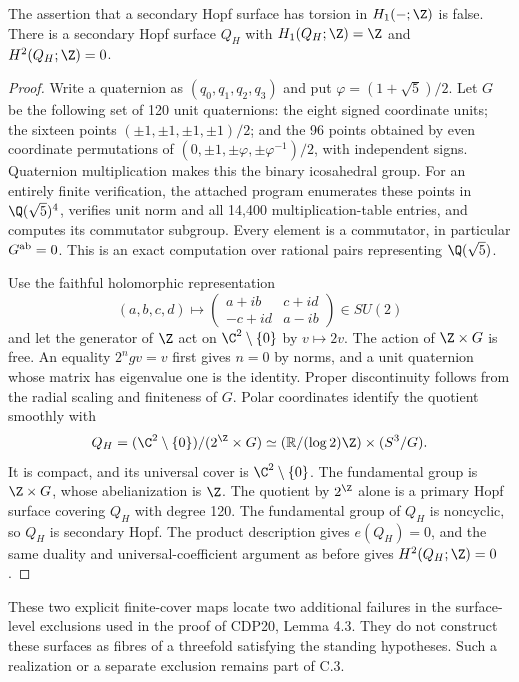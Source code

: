 
\begin{proposition}\label{cdp:st:C.3.3}

The assertion that a secondary Hopf surface has torsion in
$H_1(-;\Z)$ is false. There is a secondary Hopf surface $Q_H$ with
$H_1(Q_H;\Z)=\Z$ and $H^2(Q_H;\Z)=0$.
\end{proposition}
\begin{proof}
Write a quaternion as $(q_0,q_1,q_2,q_3)$ and put
$\varphi=(1+\sqrt5)/2$. Let $G$ be the following set of 120 unit
quaternions: the eight signed coordinate units; the sixteen points
$(\pm1,\pm1,\pm1,\pm1)/2$; and the 96 points obtained by even
coordinate permutations of
$(0,\pm1,\pm\varphi,\pm\varphi^{-1})/2$, with independent signs.
Quaternion multiplication makes this the binary icosahedral group.
For an entirely finite verification, the attached program enumerates
these points in $\Q(\sqrt5)^4$, verifies unit norm and all 14,400
multiplication-table entries, and computes its commutator subgroup.
Every element is a commutator, in particular $G^{\rm ab}=0$.
This is an exact computation over rational pairs representing
$\Q(\sqrt5)$.

Use the faithful holomorphic representation
\[
(a,b,c,d)\longmapsto
\begin{pmatrix}a+ib&c+id\\-c+id&a-ib\end{pmatrix}\in SU(2)
\]
and let the generator of $\Z$ act on $\C^2\setminus\{0\}$ by
$v\mapsto2v$. The action of $\Z\times G$ is free. An equality
$2^ngv=v$ first gives $n=0$ by norms, and a unit quaternion whose
matrix has eigenvalue one is the identity. Proper discontinuity
follows from the radial scaling and finiteness of $G$.
Polar coordinates identify the quotient smoothly with
\[
Q_H=(\C^2\setminus\{0\})/(2^{\Z}\times G)
\simeq (\mathbb R/(\log2)\Z)\times(S^3/G).
\]
It is compact, and its universal cover is $\C^2\setminus\{0\}$.
The fundamental group is $\Z\times G$, whose abelianization is
$\Z$. The quotient by $2^{\Z}$ alone is a primary Hopf surface
covering $Q_H$ with degree 120. The fundamental group of $Q_H$ is
noncyclic, so $Q_H$ is secondary Hopf. The product description gives
$e(Q_H)=0$, and the same duality and universal-coefficient argument
as before gives $H^2(Q_H;\Z)=0$.
\end{proof}

These two explicit finite-cover maps locate two additional failures
in the surface-level exclusions used in the proof of CDP20,
Lemma 4.3. They do not construct these surfaces as fibres of a
threefold satisfying the standing hypotheses. Such a realization or
a separate exclusion remains part of C.3.


